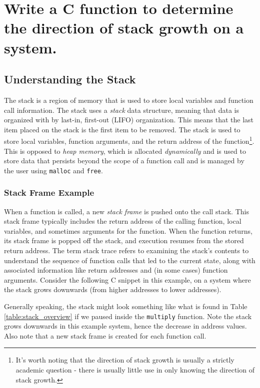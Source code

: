 \documentclass[main.tex]{subfiles}
\begin{document}
\section{Write a C function to determine the direction of stack growth on a system.}

\spoilerline

\subsection{Understanding the Stack}
The stack is a region of memory that is used to store local variables and function call information. The stack uses a \textit{stack} data structure, meaning that data is organized with by last-in, first-out (LIFO) organization. This means that the last item placed on the stack is the first item to be removed. The stack is used to store local variables, function arguments, and the return address of the function\footnote{It's worth noting that the direction of stack growth is usually a strictly academic question - there is usually little use in only knowing the direction of stack growth.}. This is opposed to \textit{heap memory}, which is allocated \textit{dynamically} and is used to store data that persists beyond the scope of a function call and is managed by the user using \texttt{malloc} and \texttt{free}.

\subsubsection{Stack Frame Example}
When a function is called, a new \textit{stack frame} is pushed onto the call stack. This stack frame typically includes the return address of the calling function, local variables, and sometimes arguments for the function. When the function returns, its stack frame is popped off the stack, and execution resumes from the stored return address. The term stack trace refers to examining the stack's contents to understand the sequence of function calls that led to the current state, along with associated information like return addresses and (in some cases) function arguments.
\newline
\newnoindentpara Consider the following C snippet in this example, on a system where the stack grows downwards (from higher addresses to lower addresses). 


\noindent Generally speaking, the stack might look something like what is found in Table \ref{table:stack_overview} if we paused inside the \texttt{multiply} function. Note the stack grows downwards in this example system, hence the decrease in address values. Also note that a new stack frame is created for each function call.
\end{document}
